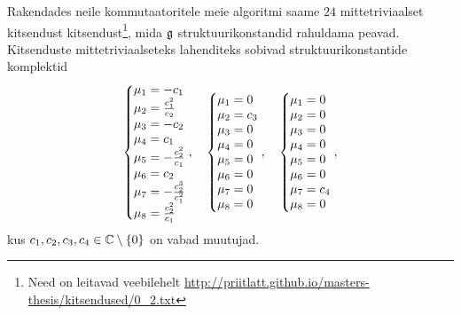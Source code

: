 Rakendades neile kommutaatoritele meie algoritmi saame $24$
mittetriviaalset kitsendust kitsendust\footnote{Need on leitavad veebilehelt
\url{http://priitlatt.github.io/masters-thesis/kitsendused/0_2.txt}},
mida $\mathfrak{g}$ struktuurikonstandid rahuldama peavad. Kitsenduste
mittetriviaalseteks lahenditeks sobivad struktuurikonstantide komplektid
\renewcommand\arraystretch{1.3}
\begin{align*}
    \left\{ \begin{matrix*}[l]
        \m_1 = -c_1 \\
        \m_2 = \frac{c_1^2}{c_2} \\
        \m_3 = -c_2 \\
        \m_4 = c_1 \\
        \m_5 = -\frac{c_2^2}{c_1} \\
        \m_6 = c_2 \\
        \m_7 = -\frac{c_2^3}{c_1^2} \\
        \m_8 = \frac{c_2^2}{c_1} \\
    \end{matrix*} \right.,
    \quad
    \left\{ \begin{matrix*}[l]
        \m_1 = 0 \\
        \m_2 = c_3 \\
        \m_3 = 0 \\
        \m_4 = 0 \\
        \m_5 = 0 \\
        \m_6 = 0 \\
        \m_7 = 0 \\
        \m_8 = 0 \\
    \end{matrix*} \right.,
    \quad
    \left\{ \begin{matrix*}[l]
        \m_1 = 0 \\
        \m_2 = 0 \\
        \m_3 = 0 \\
        \m_4 = 0 \\
        \m_5 = 0 \\
        \m_6 = 0 \\
        \m_7 = c_4 \\
        \m_8 = 0 \\
    \end{matrix*} \right.,
\end{align*}
\renewcommand\arraystretch{1}
kus $c_1, c_2, c_3, c_4 \in \mathbb{C} \setminus \{0\}$ on vabad muutujad.

